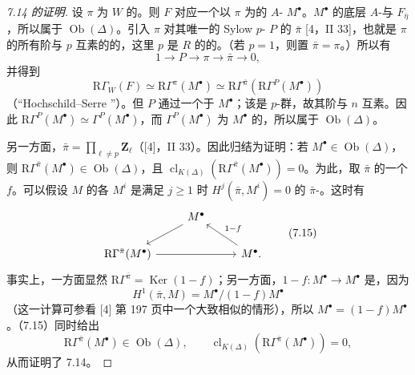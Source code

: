 \begin{proof}[7.14 的证明]
设 $\pi$ 为 $W$ 的。则 $F$ 对应一个以 $\pi$ 为的 $A$- $M^\bullet$。$M^\bullet$ 的底层 $A$-与 $F_{\bar\eta}$ ，所以属于 $\operatorname{Ob}(\Delta)$。引入 $\pi$ 对其唯一的 Sylow $p$- $P$ 的 $\bar\pi$ [4，II 33]，也就是 $\pi$ 的所有阶与 $p$ 互素的的，这里 $p$ 是 $R$ 的的。（若 $p=1$，则置 $\bar\pi=\pi$。）所以有
\[
1\longrightarrow P\longrightarrow\pi\longrightarrow\bar\pi\longrightarrow0,
\]
并得到
\[
\mathrm R\Gamma_W(F)\simeq\mathrm R\Gamma^\pi(M^\bullet)
\simeq\mathrm R\Gamma^{\bar\pi}(\mathrm R\Gamma^P(M^\bullet))
\]
（“Hochschild--Serre ”）。但 $P$ 通过一个于 $M^\bullet$；该是 $p$-群，故其阶与 $n$ 互素。因此
$\mathrm R\Gamma^P(M^\bullet)\simeq\Gamma^P(M^\bullet)$，而 $\Gamma^P(M^\bullet)$ 为 $M^\bullet$ 的，所以属于 $\operatorname{Ob}(\Delta)$。

另一方面，$\bar\pi=\prod_{\ell\ne p}\mathbf Z_\ell$（[4]，II 33）。因此归结为证明：若 $M^\bullet\in\operatorname{Ob}(\Delta)$，则 $\mathrm R\Gamma^{\bar\pi}(M^\bullet)\in\operatorname{Ob}(\Delta)$，且 $\operatorname{cl}_{K(\Delta)}(\mathrm R\Gamma^{\bar\pi}(M^\bullet))=0$。为此，取 $\bar\pi$ 的一个 $f$。可以假设 $M$ 的各 $M^i$ 是满足 $j\geq1$ 时 $H^j(\bar\pi,M^i)=0$ 的 $\bar\pi$-。这时有
\[
\begin{tikzcd}
&M^\bullet\arrow[dl]&\\
\mathrm R\Gamma^{\bar\pi}(M^\bullet)\arrow[rr]&&M^\bullet\arrow[ul,"1-f"'].
\end{tikzcd}\tag{7.15}
\]
事实上，一方面显然 $\mathrm R\Gamma^{\bar\pi}=\operatorname{Ker}(1-f)$；另一方面，$1-f:M^\bullet\longrightarrow M^\bullet$ 是，因为
\[
H^1(\bar\pi,M)=M^\bullet/(1-f)M^\bullet
\]
（这一计算可参看 [4] 第 197 页中一个大致相似的情形），所以 $M^\bullet=(1-f)M^\bullet$。（7.15）同时给出
\[
\mathrm R\Gamma^{\bar\pi}(M^\bullet)\in\operatorname{Ob}(\Delta),\qquad
\operatorname{cl}_{K(\Delta)}(\mathrm R\Gamma^{\bar\pi}(M^\bullet))=0,
\]
从而证明了 7.14。
\end{proof}


